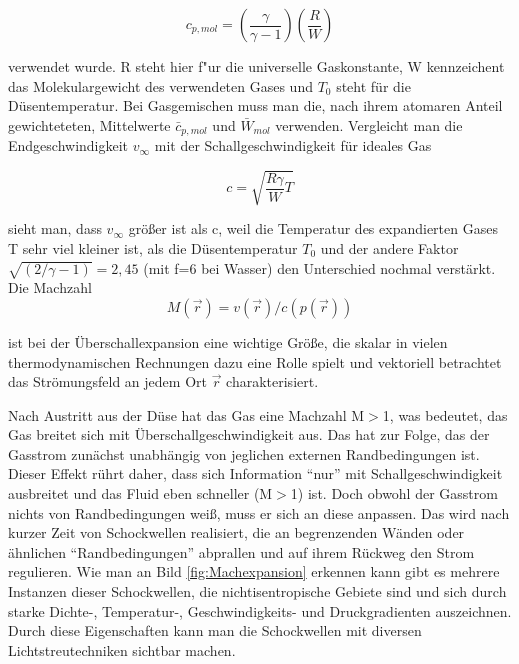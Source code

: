 \begin{equation}
c_{p,mol}= \left(\frac{\gamma}{\gamma-1}\right)\left(\frac{R}{W}\right)
\end{equation}

verwendet wurde. R steht hier f"ur die universelle Gaskonstante, W kennzeichent das Molekulargewicht des verwendeten Gases und $T_0$ steht für die Düsentemperatur.
Bei Gasgemischen muss man die, nach ihrem atomaren Anteil gewichteteten, Mittelwerte $\bar{c}_{p,mol}$ und $\bar{W}_{mol}$ verwenden.
Vergleicht man die Endgeschwindigkeit $v_{\infty}$ mit der Schallgeschwindigkeit für ideales Gas

\begin{equation}
c=\sqrt{\frac{R \gamma}{W}T}
\end{equation}

sieht man, dass $v_{\infty}$ größer ist als c, weil die Temperatur des expandierten Gases T sehr viel kleiner ist, als die Düsentemperatur $T_0$ und der andere Faktor $\sqrt{(2/\gamma -1)}=2,45$ (mit f=6 bei Wasser) den Unterschied nochmal verstärkt.\\
Die Machzahl 
\begin{equation}
M(\vec{r})= v(\vec{r})/c(p(\vec{r}))
\end{equation}

ist bei der Überschallexpansion eine wichtige Größe, die skalar in vielen thermodynamischen Rechnungen dazu eine Rolle spielt und vektoriell betrachtet das Strömungsfeld an jedem Ort $\vec{r}$ charakterisiert. 

Nach Austritt aus der Düse hat das Gas eine Machzahl M$>$1, was bedeutet, das Gas breitet sich mit Überschallgeschwindigkeit aus. Das hat zur Folge, das der Gasstrom zunächst unabhängig von jeglichen externen Randbedingungen ist. Dieser Effekt rührt daher, dass sich Information \enquote{nur} mit Schallgeschwindigkeit ausbreitet und das Fluid eben schneller (M$>$1) ist. Doch obwohl der Gasstrom nichts von Randbedingungen weiß, muss er sich an diese anpassen. Das wird nach kurzer Zeit von Schockwellen realisiert, die an begrenzenden Wänden oder ähnlichen \enquote{Randbedingungen} abprallen und auf ihrem Rückweg den Strom regulieren. Wie man an Bild \ref{fig:Machexpansion} erkennen kann gibt es mehrere Instanzen dieser Schockwellen, die nichtisentropische Gebiete sind und sich durch starke Dichte-, Temperatur-, Geschwindigkeits- und Druckgradienten auszeichnen. Durch diese Eigenschaften kann man die Schockwellen mit diversen Lichtstreutechniken sichtbar machen.

